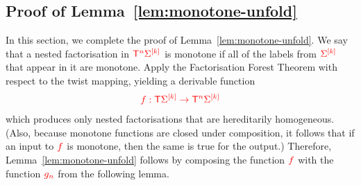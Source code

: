 


\subsection{Proof of Lemma~\ref{lem:monotone-unfold}}
\label{sec:monotone-unfold-proof}
In this section, we complete the proof of Lemma~\ref{lem:monotone-unfold}.  We say that a nested factorisation in ${\color{red}{\mathsf T}}^{{\color{red}{n}}} {\color{red}{\Sigma}}^{{\color{red}{[k]}}}$ is monotone if all of the labels from ${\color{red}{\Sigma}}^{{\color{red}{[k]}}}$ that appear in it are monotone. 
 Apply the Factorisation Forest Theorem with respect to the twist mapping, yielding a derivable function
\begin{align*}
{\color{red}{ f : {\color{red}{\mathsf T}}{\color{red}{\Sigma}}^{{\color{red}{[k]}}} \to {\color{red}{\mathsf T}}^{{\color{red}{n}}} {\color{red}{\Sigma}}^{{\color{red}{[k]}}}}}
\end{align*}
which produces only nested factorisations that are  hereditarily homogeneous. (Also, because monotone functions are closed under composition, it follows that if  an input to ${\color{red}{f}}$ is monotone, then the same is true for the output.) Therefore,  Lemma~\ref{lem:monotone-unfold} follows by composing the function ${\color{red}{f}}$ with the function ${\color{red}{g_n}}$ from the following lemma. 

